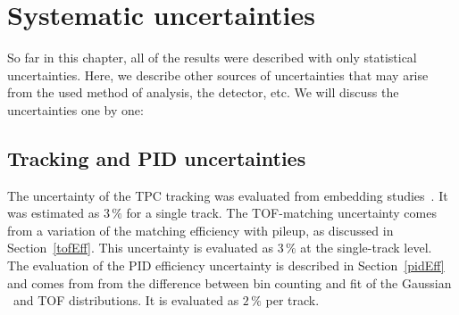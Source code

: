 % 
% 



\section{Systematic uncertainties}

So far in this chapter, all of the results were described with only statistical uncertainties. Here, we describe other sources of uncertainties that may arise from the used method of analysis, the detector, etc. We will discuss the uncertainties one by one:

\subsection{Tracking and PID uncertainties}
The uncertainty of the TPC tracking was evaluated from embedding studies~\cite{D0paper}. It was estimated as 3$\,\%$ for a single track. The TOF-matching uncertainty comes from a variation of the matching efficiency with pileup, as discussed in Section~\ref{tofEff}\@. This uncertainty is evaluated as 3$\,\%$ at the single-track level. The evaluation of the PID efficiency uncertainty is described in Section~\ref{pidEff} and comes from from the difference between bin counting and fit of the Gaussian \dedx\ and TOF distributions. It is evaluated as $2\,\%$ per track.


